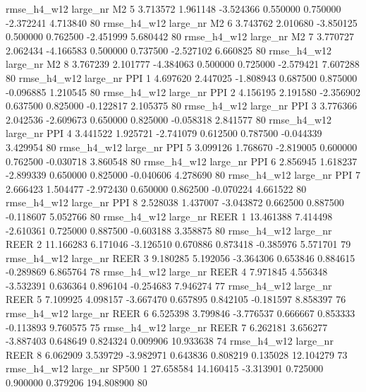  rmse_h4_w12   large_nr       M2                 5  3.713572  1.961148  -3.524366 0.550000 0.750000 -2.372241    4.713840 80
 rmse_h4_w12   large_nr       M2                 6  3.743762  2.010680  -3.850125 0.500000 0.762500 -2.451999    5.680442 80
 rmse_h4_w12   large_nr       M2                 7  3.770727  2.062434  -4.166583 0.500000 0.737500 -2.527102    6.660825 80
 rmse_h4_w12   large_nr       M2                 8  3.767239  2.101777  -4.384063 0.500000 0.725000 -2.579421    7.607288 80
 rmse_h4_w12   large_nr      PPI                 1  4.697620  2.447025  -1.808943 0.687500 0.875000 -0.096885    1.210545 80
 rmse_h4_w12   large_nr      PPI                 2  4.156195  2.191580  -2.356902 0.637500 0.825000 -0.122817    2.105375 80
 rmse_h4_w12   large_nr      PPI                 3  3.776366  2.042536  -2.609673 0.650000 0.825000 -0.058318    2.841577 80
 rmse_h4_w12   large_nr      PPI                 4  3.441522  1.925721  -2.741079 0.612500 0.787500 -0.044339    3.429954 80
 rmse_h4_w12   large_nr      PPI                 5  3.099126  1.768670  -2.819005 0.600000 0.762500 -0.030718    3.860548 80
 rmse_h4_w12   large_nr      PPI                 6  2.856945  1.618237  -2.899339 0.650000 0.825000 -0.040606    4.278690 80
 rmse_h4_w12   large_nr      PPI                 7  2.666423  1.504477  -2.972430 0.650000 0.862500 -0.070224    4.661522 80
 rmse_h4_w12   large_nr      PPI                 8  2.528038  1.437007  -3.043872 0.662500 0.887500 -0.118607    5.052766 80
 rmse_h4_w12   large_nr     REER                 1 13.461388  7.414498  -2.610361 0.725000 0.887500 -0.603188    3.358875 80
 rmse_h4_w12   large_nr     REER                 2 11.166283  6.171046  -3.126510 0.670886 0.873418 -0.385976    5.571701 79
 rmse_h4_w12   large_nr     REER                 3  9.180285  5.192056  -3.364306 0.653846 0.884615 -0.289869    6.865764 78
 rmse_h4_w12   large_nr     REER                 4  7.971845  4.556348  -3.532391 0.636364 0.896104 -0.254683    7.946274 77
 rmse_h4_w12   large_nr     REER                 5  7.109925  4.098157  -3.667470 0.657895 0.842105 -0.181597    8.858397 76
 rmse_h4_w12   large_nr     REER                 6  6.525398  3.799846  -3.776537 0.666667 0.853333 -0.113893    9.760575 75
 rmse_h4_w12   large_nr     REER                 7  6.262181  3.656277  -3.887403 0.648649 0.824324  0.009906   10.933638 74
 rmse_h4_w12   large_nr     REER                 8  6.062909  3.539729  -3.982971 0.643836 0.808219  0.135028   12.104279 73
 rmse_h4_w12   large_nr    SP500                 1 27.658584 14.160415  -3.313901 0.725000 0.900000  0.379206  194.808900 80
